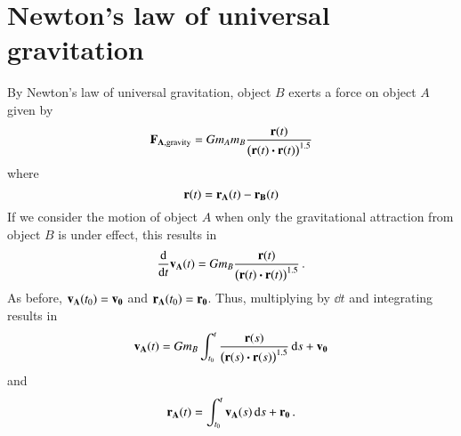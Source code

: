 \documentclass[ ../main.tex]{subfiles}
\begin{document}
\section{Newton's law of universal gravitation}
By Newton's law of universal gravitation, object $B$ exerts a force on object $A$ given by
\begin{equation}
    \vb{F_{A,\mathrm{gravity}}} = G m_A m_B \frac{\vb{r}(t)}{\left(\vb{r}(t) \vdot \vb{r}(t) \right)^{1.5}}
\end{equation}
where
\begin{equation}
    \vb{r}(t) = \vb{r_A}(t) - \vb{r_B}(t)
\end{equation}
If we consider the motion of object $A$ when only the gravitational attraction from object $B$ is under effect, this results in
\begin{equation}
    \dv{t} \vb{v_A}(t) = G m_B \frac{\vb{r}(t)}{\left(\vb{r}(t) \vdot \vb{r}(t) \right)^{1.5}}\,.
\end{equation}
As before, $\vb{v_A}(t_0) = \vb{v_0}$ and $\vb{r_A}(t_0) = \vb{r_0}$. Thus, multiplying by $\dd{t}$ and integrating results in
\begin{equation}
\vb{v_A}(t) = G m_B \int_{t_0}^{t} \frac{\vb{r}(s)}{\left(\vb{r}(s) \vdot \vb{r}(s) \right)^{1.5}} \dd{s} + \vb{v_0}
\end{equation}
and
\begin{equation}
\vb{r_A}(t) = \int_{t_0}^{t} \vb{v_A}(s) \dd{s} + \vb{r_0}\,.
\end{equation}
\end{document}
